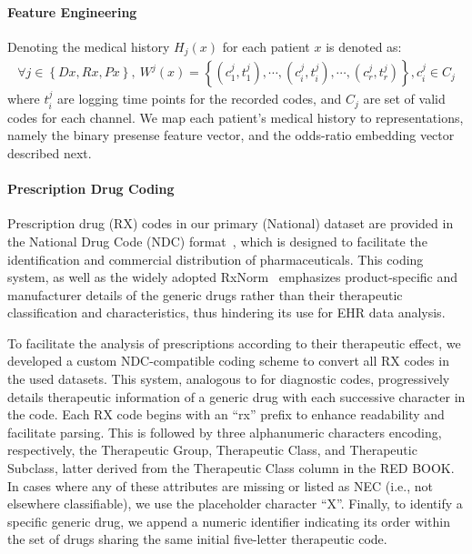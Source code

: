 \documentclass[onecolumn, compsoc,11pt]{IEEEtran}
\def\EQSP{3pt}
\newcommand{\cgather}[2][\EQSP]{\begingroup\setlength\abovedisplayskip{#1}\setlength\belowdisplayskip{#1}\begin{gather} #2 \end{gather}\endgroup\noindent}
\begin{document}
 

\paragraph*{Feature Engineering}
Denoting the  medical history $H_j(x)$  for each patient $x$ is denoted as: 
\cgather{
\forall j \in \left  \{Dx,Rx,Px \right \}, \ W^j(x) = \left \{ (c_1^j,t_1^j), \cdots, (c_i^j,t_i^j), \cdots, (c_r^j,t_r^j) \right \}, c_i^j \in C_j
}
where $t_i^j$ are logging time points for the recorded codes, and $C_j$ are set of valid codes for each channel. We map each patient's medical history to representations, namely the binary presense feature vector, and the odds-ratio embedding vector described next.

















\paragraph*{Prescription Drug Coding}
 
Prescription drug (RX) codes in our primary (National) dataset are provided in the National Drug Code (NDC) format~\cite{FDA_NDC}, which is designed to facilitate the identification and commercial distribution of pharmaceuticals. This coding system, as well as the widely adopted RxNorm~\cite{NLM_RxNorm} emphasizes product-specific and manufacturer details of the generic drugs rather than their therapeutic classification and characteristics, thus hindering its use for EHR data analysis.




  




To facilitate the analysis of prescriptions according to their therapeutic effect, we developed a custom NDC-compatible coding scheme to convert all RX codes in the used datasets. This system, analogous to \ICD for diagnostic codes, progressively details therapeutic information of a generic drug with each successive character in the code. Each RX code begins with an ``rx'' prefix to enhance readability and facilitate parsing. This is followed by three alphanumeric characters encoding, respectively, the Therapeutic Group, Therapeutic Class, and Therapeutic Subclass, latter derived from the Therapeutic Class column in the RED BOOK. In cases where any of these attributes are missing or listed as NEC (i.e., not elsewhere classifiable), we use the placeholder character ``X''. Finally, to identify a specific generic drug, we append a numeric identifier indicating its order within the set of drugs sharing the same initial five-letter therapeutic code.
\end{document}
